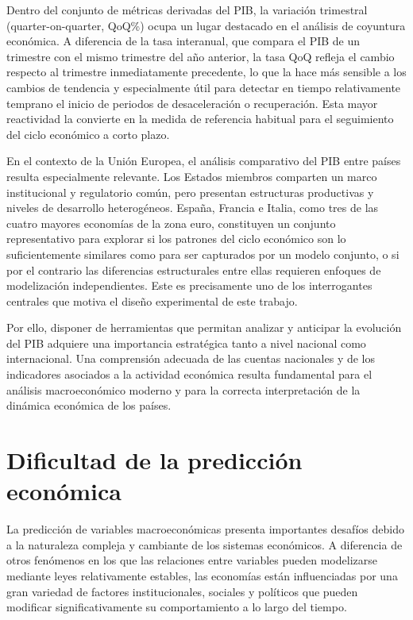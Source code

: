 Dentro del conjunto de métricas derivadas del PIB, la variación trimestral (quarter-on-quarter, QoQ\%) ocupa un lugar destacado en el análisis de coyuntura económica. A diferencia de la tasa interanual, que compara el PIB de un trimestre con el mismo trimestre del año anterior, la tasa QoQ refleja el cambio respecto al trimestre inmediatamente precedente, lo que la hace más sensible a los cambios de tendencia y especialmente útil para detectar en tiempo relativamente temprano el inicio de periodos de desaceleración o recuperación. Esta mayor reactividad la convierte en la medida de referencia habitual para el seguimiento del ciclo económico a corto plazo.

En el contexto de la Unión Europea, el análisis comparativo del PIB entre países resulta especialmente relevante. Los Estados miembros comparten un marco institucional y regulatorio común, pero presentan estructuras productivas y niveles de desarrollo heterogéneos. España, Francia e Italia, como tres de las cuatro mayores economías de la zona euro, constituyen un conjunto representativo para explorar si los patrones del ciclo económico son lo suficientemente similares como para ser capturados por un modelo conjunto, o si por el contrario las diferencias estructurales entre ellas requieren enfoques de modelización independientes. Este es precisamente uno de los interrogantes centrales que motiva el diseño experimental de este trabajo.

Por ello, disponer de herramientas que permitan analizar y anticipar la evolución del PIB adquiere una importancia estratégica tanto a nivel nacional como internacional. Una comprensión adecuada de las cuentas nacionales y de los indicadores asociados a la actividad económica resulta fundamental para el análisis macroeconómico moderno y para la correcta interpretación de la dinámica económica de los países.

\section{Dificultad de la predicción económica}

La predicción de variables macroeconómicas presenta importantes desafíos debido a la naturaleza compleja y cambiante de los sistemas económicos. A diferencia de otros fenómenos en los que las relaciones entre variables pueden modelizarse mediante leyes relativamente estables, las economías están influenciadas por una gran variedad de factores institucionales, sociales y políticos que pueden modificar significativamente su comportamiento a lo largo del tiempo. \citet{stock_watson_2003}

